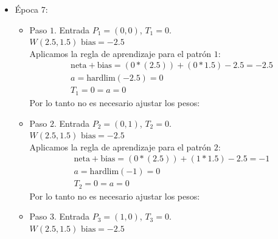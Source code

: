 \documentclass{article}
\begin{document}
{{\begin{itemize}
\begin{itemize}
Aplicamos la regla de aprendizaje para el patrón $4$:
\begin{align*}
&\text{neta} + \text{bias}= (1 * (1.5)) + (1 * 0.5) - 3.5 = -1.5\\
&a = \text{hardlim}(-1.5) = 0 \\
&T_4 = 1 \neq a = 0
\end{align*}
Por lo tanto es necesario ajustar los pesos:
\begin{align*}
&e = T_4 - a = 1- 0 =  1, \\
&W_n = W + e* P_4 = (1.5, 0.5) + (1) * (1,1) = (2.5, 1.5) \\
&\text{bias}_N = \text{bias} + e = -3.5 + 1 = -2.5
\end{align*}
\end{itemize}

\item Época 7:
\begin{itemize}
\item Paso $1$. Entrada $P_1 = (0, 0)$, $T_1 = 0$. \\
$W(2.5, 1.5)$  $\text{bias} = -2.5$ \\

Aplicamos la regla de aprendizaje para el patrón $1$:
\begin{align*}
&\text{neta} + \text{bias}= (0 * (2.5)) + (0 * 1.5) - 2.5 = -2.5\\
&a = \text{hardlim}(-2.5) = 0 \\
&T_1 = 0 = a = 0
\end{align*}
Por lo tanto no es necesario ajustar los pesos:

\item Paso $2$. Entrada $P_2 = (0, 1)$, $T_2 = 0$. \\
$W(2.5, 1.5)$  $\text{bias} = -2.5$ \\

Aplicamos la regla de aprendizaje para el patrón $2$:
\begin{align*}
&\text{neta} + \text{bias}= (0 * (2.5)) + (1 * 1.5) - 2.5 = -1\\
&a = \text{hardlim}(-1) = 0 \\
&T_2 = 0 = a = 0
\end{align*}
Por lo tanto no es necesario ajustar los pesos:

\item Paso $3$. Entrada $P_3 = (1, 0)$, $T_3 = 0$. \\
$W(2.5, 1.5)$  $\text{bias} = -2.5$ \\


\end{itemize}
\end{itemize}}}
\end{document}
